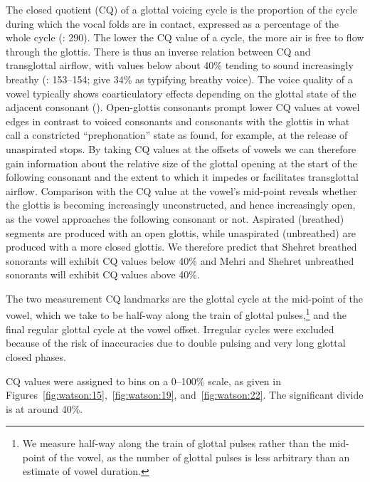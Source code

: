 \documentclass[output=paper]{langscibook}
\begin{document}
The closed quotient (CQ) of a glottal voicing cycle is the proportion of the cycle during which the vocal folds are in contact, expressed as a percentage of the whole cycle (\citealt{AbbertonFourcin1989}: 290). The lower the CQ value of a cycle, the more air is free to flow through the glottis. There is thus an inverse relation between CQ and transglottal airflow, with values below about 40\% tending to sound increasingly breathy (\citealt{HeselwoodMaghrabi2015}: 153–154; \citealt{WrightEtAl2019} give 34\% as typifying breathy voice). The voice quality of a vowel typically shows coarticulatory effects depending on the glottal state of the adjacent consonant (\citealt{GoblChasaide1999}). Open-glottis consonants prompt lower CQ values at vowel edges in contrast to voiced consonants and consonants with the glottis in what \citet[356]{EslingHarris2005} call a constricted ``prephonation'' state as found,
for example, at the release of unaspirated stops. By taking CQ values at the offsets of vowels we can therefore gain information about the relative size of the glottal opening at the start of the following consonant and the extent to which it impedes or facilitates transglottal airflow. Comparison with the CQ value at the vowel’s mid-point reveals whether the glottis is becoming increasingly unconstructed, and hence increasingly open, as the vowel approaches the following consonant or not. Aspirated (breathed) segments are produced with an open glottis, while unaspirated (unbreathed) are produced with a more closed glottis. We therefore predict that Shehret breathed sonorants will exhibit CQ values below 40\% and Mehri and Shehret unbreathed sonorants will exhibit CQ values above 40\%.

The two measurement CQ landmarks are the glottal cycle at the mid-point of the vowel, which we take to be half-way along the train of glottal pulses,\footnote{We measure half-way along the train of glottal pulses rather than the mid-point of the vowel, as the number of glottal pulses is less arbitrary than an estimate of vowel duration.} and the final regular glottal cycle at the vowel offset. Irregular cycles were excluded because of the risk of inaccuracies due to double pulsing and very long glottal closed phases.

CQ values were assigned to bins on a 0–100\% scale, as given in Figures~\ref{fig:watson:15},~\ref{fig:watson:19}, and~\ref{fig:watson:22}. The significant divide is at around 40\%.
\end{document}
